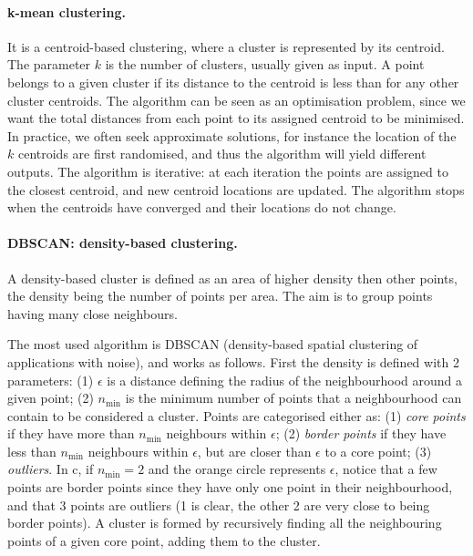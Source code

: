 \paragraph{k-mean clustering.} 
It is a centroid-based clustering, where a cluster is represented by its centroid.
The parameter $k$ is the number of clusters, usually given as input.
A point belongs to a given cluster if its distance to the centroid is less than for any other cluster centroids.
The algorithm can be seen as an optimisation problem, since we want the total distances from each point to its assigned centroid to be minimised.
In practice, we often seek approximate solutions, for instance the location of the $k$ centroids are first randomised, and thus the algorithm will yield different outputs.
The algorithm is iterative: at each iteration the points are assigned to the closest centroid, and new centroid locations are updated.
The algorithm stops when the centroids have converged and their locations do not change.

%

\paragraph{DBSCAN: density-based clustering.} 
A density-based cluster is defined as an area of higher density then other points, the density being the number of points per area.
The aim is to group points having many close neighbours.

%

The most used algorithm is DBSCAN (density-based spatial clustering of applications with noise), and works as follows.
First the density is defined with 2 parameters: (1) $\epsilon$ is a distance defining the radius of the neighbourhood around a given point; (2) $n_{\min}$ is the minimum number of points that a neighbourhood can contain to be considered a cluster.
Points are categorised either as: (1) \emph{core points} if they have more than $n_{\min}$ neighbours within $\epsilon$; (2) \emph{border points} if they have less than $n_{\min}$ neighbours within $\epsilon$, but are closer than $\epsilon$ to a core point; (3) \emph{outliers}.
In c, if $n_{\min} = 2$ and the orange circle represents $\epsilon$, notice that a few points are border points since they have only one point in their neighbourhood, and that 3 points are outliers (1 is clear, the other 2 are very close to being border points).
A cluster is formed by recursively finding all the neighbouring points of a given core point, adding them to the cluster.

